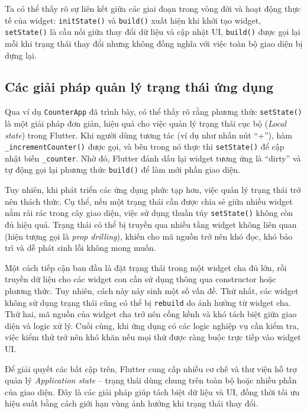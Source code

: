 \documentclass[../DoAn.tex]{subfiles}
\numberwithin{figure}{chapter}
\begin{document}
Ta có thể thấy rõ sự liên kết giữa các giai đoạn trong vòng đời và hoạt động thực tế của widget: \texttt{initState()} và \texttt{build()} xuất hiện khi khởi tạo widget, \texttt{setState()} là cầu nối giữa thay đổi dữ liệu và cập nhật UI, \texttt{build()} được gọi lại mỗi khi trạng thái thay đổi nhưng không đồng nghĩa với việc toàn bộ giao diện bị dựng lại.

\subsection{Các giải pháp quản lý trạng thái ứng dụng}
Qua ví dụ \texttt{CounterApp} đã trình bày, có thể thấy rõ rằng phương thức \texttt{setState()} là một giải pháp đơn giản, hiệu quả cho việc quản lý trạng thái cục bộ (\textit{Local state}) trong Flutter. Khi người dùng tương tác (ví dụ như nhấn nút “+”), hàm \texttt{\_incrementCounter()} được gọi, và bên trong nó thực thi \texttt{setState()} để cập nhật biến \texttt{\_counter}. Nhờ đó, Flutter đánh dấu lại widget tương ứng là “dirty” và tự động gọi lại phương thức \texttt{build()} để làm mới phần giao diện.

Tuy nhiên, khi phát triển các ứng dụng phức tạp hơn, việc quản lý trạng thái trở nên thách thức. Cụ thể, nếu một trạng thái cần được chia sẻ giữa nhiều widget nằm rải rác trong cây giao diện, việc sử dụng thuần túy \texttt{setState()} không còn đủ hiệu quả. Trạng thái có thể bị truyền qua nhiều tầng widget không liên quan (hiện tượng gọi là \textit{prop drilling}), khiến cho mã nguồn trở nên khó đọc, khó bảo trì và dễ phát sinh lỗi không mong muốn.

Một cách tiếp cận ban đầu là đặt trạng thái trong một widget cha đủ lớn, rồi truyền dữ liệu cho các widget con cần sử dụng thông qua constructor hoặc phương thức. Tuy nhiên, cách này nảy sinh một số vấn đề. Thứ nhất, các widget không sử dụng trạng thái cũng có thể bị \texttt{rebuild} do ảnh hưởng từ widget cha. Thứ hai, mã nguồn của widget cha trở nên cồng kềnh và khó tách biệt giữa giao diện và logic xử lý. Cuối cùng, khi ứng dụng có các logic nghiệp vụ cần kiểm tra, việc kiểm thử trở nên khó khăn nếu mọi thứ được ràng buộc trực tiếp vào widget UI.

Để giải quyết các bất cập trên, Flutter cung cấp nhiều cơ chế và thư viện hỗ trợ quản lý \textit{Application state} – trạng thái dùng chung trên toàn bộ hoặc nhiều phần của giao diện. Đây là các giải pháp giúp tách biệt dữ liệu và UI, đồng thời tối ưu hiệu suất bằng cách giới hạn vùng ảnh hưởng khi trạng thái thay đổi.
\end{document}
